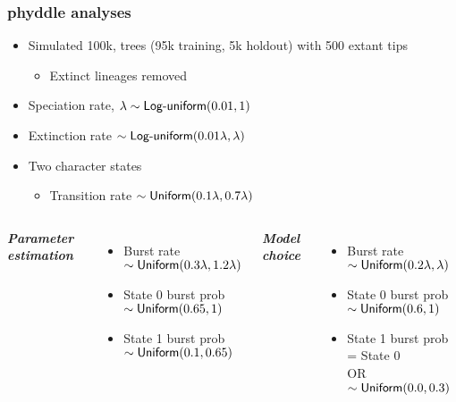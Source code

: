 \begin{frame}
    \frametitle{phyddle analyses}


    \begin{itemize}
        \setlength{\itemindent}{6em}
        \item Simulated 100k, trees (95k training, 5k holdout) with 500 extant tips
        \begin{itemize}
            \setlength{\itemindent}{6em}
            \item Extinct lineages removed
        \end{itemize}
        \item Speciation rate, $\lambda \sim \textrm{\sffamily Log-uniform}(0.01, 1)$
        \item Extinction rate $ \sim \textrm{\sffamily Log-uniform}(0.01\lambda, \lambda)$
        \item Two character states
        \begin{itemize}
            \setlength{\itemindent}{6em}
            \item Transition rate $ \sim \textrm{\sffamily Uniform}(0.1\lambda, 0.7\lambda)$
        \end{itemize}
    \end{itemize}

    \begin{columns}[T]
        \begin{center}
            \textbf{\textit{Parameter estimation}}
        \end{center}
        \begin{itemize}
            \item Burst rate $ \sim \textrm{\sffamily Uniform}(0.3\lambda, 1.2\lambda)$
            \item State 0 burst prob $ \sim \textrm{\sffamily Uniform}(0.65, 1)$
            \item State 1 burst prob $ \sim \textrm{\sffamily Uniform}(0.1, 0.65)$
        \end{itemize}

        \begin{center}
            \textbf{\textit{Model choice}}
        \end{center}
        \begin{itemize}
            \item Burst rate $ \sim \textrm{\sffamily Uniform}(0.2\lambda, \lambda)$
            \item State 0 burst prob $ \sim \textrm{\sffamily Uniform}(0.6, 1)$
            \item State 1 burst prob = State 0 \\ OR $ \sim \textrm{\sffamily Uniform}(0.0, 0.3)$
        \end{itemize}
    \end{columns}
\end{frame}
